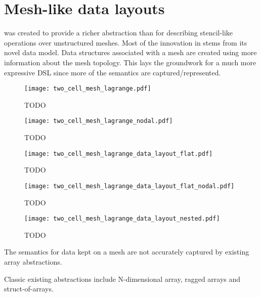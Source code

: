 \documentclass[thesis]{subfiles}
\begin{document}
\chapter{Mesh-like data layouts}
\label{chapter:mesh_data_layouts}

 was created to provide a richer abstraction than  for describing stencil-like operations over unstructured meshes.
Most of the innovation in  stems from its novel data model.
Data structures associated with a mesh are created using more information about the mesh topology.
This lays the groundwork for a much more expressive DSL since more of the semantics are captured/represented.

\begin{figure}
  \centering
  \texttt{[image: two\_cell\_mesh\_lagrange.pdf]}
  \caption{TODO}
  \label{fig:two_cell_mesh_lagrange}
\end{figure}

\begin{figure}
  \centering
  \texttt{[image: two\_cell\_mesh\_lagrange\_nodal.pdf]}
  \caption{TODO}
  \label{fig:two_cell_mesh_lagrange_nodal}
\end{figure}

\begin{figure}
  \centering
  \texttt{[image: two\_cell\_mesh\_lagrange\_data\_layout\_flat.pdf]}
  \caption{TODO}
  \label{fig:two_cell_mesh_lagrange_data_layout_flat}
\end{figure}

\begin{figure}
  \centering
  \texttt{[image: two\_cell\_mesh\_lagrange\_data\_layout\_flat\_nodal.pdf]}
  \caption{TODO}
  \label{fig:two_cell_mesh_lagrange_data_layout_flat_nodal}
\end{figure}

\begin{figure}
  \centering
  \texttt{[image: two\_cell\_mesh\_lagrange\_data\_layout\_nested.pdf]}
  \caption{TODO}
  \label{fig:two_cell_mesh_lagrange_data_layout_nested}
\end{figure}

The semantics for data kept on a mesh are not accurately captured by existing array abstractions.

Classic existing abstractions include N-dimensional array, ragged arrays and struct-of-arrays.
\end{document}
